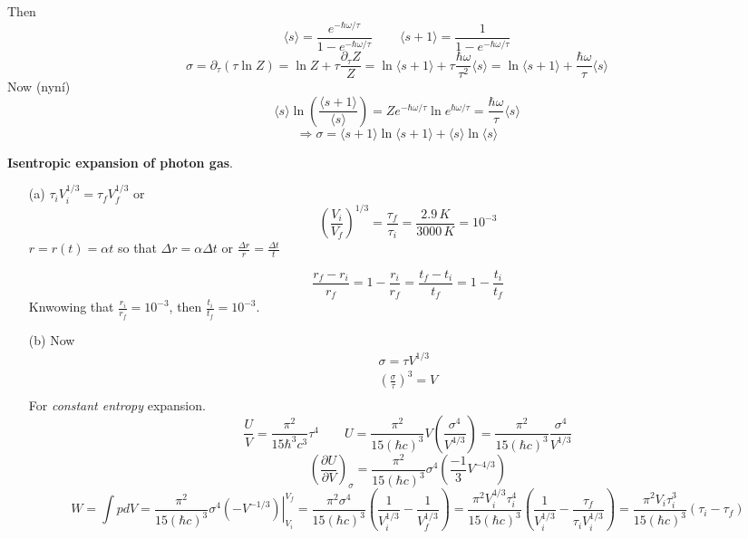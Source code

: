 Then 
\[
\langle s \rangle = \frac{ e^{-\hbar \omega/\tau} }{ 1 - e^{-\hbar \omega/\tau} } \quad \quad \, \langle s +1 \rangle  = \frac{1}{1- e^{-\hbar \omega/\tau } }
\]
\[
\sigma = \partial_{\tau} (\tau \ln{Z})  = \ln{Z} + \tau \frac{ \partial_{\tau} Z}{ Z} = \ln{ \langle s + 1 \rangle } + \tau \frac{\hbar \omega}{\tau^2} \langle s \rangle = \ln{ \langle s + 1 \rangle } + \frac{\hbar \omega }{\tau } \langle s \rangle
\]
Now (nyn\'{i})
\[
\langle s \rangle \ln{ \left( \frac{ \langle s  +1 \rangle }{ \langle s  \rangle } \right) } = Z e^{-\hbar \omega/\tau } \ln{ e^{ \hbar \omega/\tau } } = \frac{ \hbar \omega}{\tau} \langle s \rangle 
\]
\[
\Longrightarrow \boxed{ \sigma = \langle s + 1 \rangle \ln{ \langle s + 1 \rangle } + \langle s \rangle \ln{ \langle s \rangle } }
\]





 \textbf{Isentropic expansion of photon gas}. \begin{itemize}
\item[(a)] $\tau_i V_i^{1/3} = \tau_f V_f^{1/3}$ or 
\[
\left( \frac{V_i}{V_f} \right)^{1/3} = \frac{\tau_f}{\tau_i} = \frac{2.9 \, K}{ 3000 \, K } = 10^{-3}
\]
$r = r(t) = \alpha t$ so that $\Delta r = \alpha \Delta t$ or $\frac{\Delta r}{r} = \frac{\Delta t}{t}$

\[
\frac{ r_f - r_i }{r_f} = 1 - \frac{r_i}{r_f} = \frac{t_f - t_i}{t_f}= 1 - \frac{t_i}{t_f} 
\]
Knwowing that $\frac{r_i}{r_f} = 10^{-3}$, then $\frac{t_i}{t_f} = 10^{-3}$.  
\item[(b)] Now
\[
\begin{aligned}
  \sigma = \tau V^{1/3} \\ 
  \left( \frac{ \sigma}{\tau} \right)^3 = V \\ 
\end{aligned}
\]
For \emph{constant entropy} expansion.  
\[
\frac{U}{V} = \frac{\pi^2 }{ 15 \hbar^3 c^3 } \tau^4 \quad \quad U = \frac{\pi^2 }{ 15 (\hbar c)^3 } V \left( \frac{\sigma^4}{ V^{4/3} } \right) = \frac{\pi^2 }{15 ( \hbar c)^3 } \frac{\sigma^4 }{ V^{1/3} } 
\]
\[
\left( \frac{ \partial U}{ \partial V} \right)_{\sigma} = \frac{\pi^2 }{15 (\hbar c)^3 } \sigma^4 \left( \frac{-1}{3} V^{-4/3} \right)
\]
\[
W = \int p dV  = \frac{\pi^2 }{15(\hbar c)^3 } \sigma^4 \left. (-V^{-1/3} ) \right|_{V_i}^{V_f} = \frac{\pi^2 \sigma^4 }{ 15 (\hbar c)^3 } \left( \frac{1}{V_i^{1/3}} - \frac{1}{V_f^{1/3}} \right) = \frac{\pi^2 V_i^{4/3} \tau_i^4 }{15 (\hbar c)^3 } \left( \frac{1}{V_i^{1/3}} - \frac{\tau_f}{\tau_i V_i^{1/3} } \right) = \frac{\pi^2 V_i \tau_i^3}{ 15(\hbar c)^3 } (\tau_i - \tau_f)
\]
\end{itemize}





